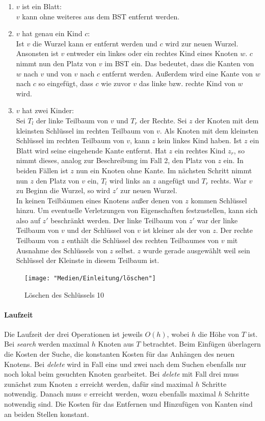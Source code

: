 \documentclass[a4paper,12pt]{article}
\begin{document}
\begin{enumerate}
	\item $v$ ist ein Blatt: \\
	$v$ kann ohne weiteres aus dem BST entfernt werden.
	\item $v$ hat genau ein Kind $c$:\\
	Ist $v$ die Wurzel kann er entfernt werden und $c$ wird zur neuen Wurzel. Ansonsten ist $v$ entweder ein linkes oder ein rechtes Kind eines Knoten $w$. $c$ nimmt nun den Platz von $v$ im BST ein. Das bedeutet, dass die Kanten von $w$ nach $v$ und von $v$ nach $c$ entfernt werden. Außerdem wird eine Kante von $w$ nach $c$ so eingefügt, dass $c$ wie zuvor $v$ das linke bzw. rechte Kind von $w$ wird. 
	\item $v$ hat zwei Kinder:\\
	Sei $T_l$ der linke Teilbaum von $v$ und $T_r$ der Rechte.
	Sei $z$ der Knoten mit dem kleinsten Schlüssel im rechten Teilbaum von $v$. Als Knoten mit dem kleinsten Schlüssel im rechten Teilbaum von $v$, kann $z$ kein linkes Kind haben. Ist $z$ ein Blatt wird seine eingehende Kante entfernt. Hat $z$ ein rechtes Kind $z_r$, so nimmt dieses, analog zur Beschreibung im Fall 2, den Platz von $z$ ein. In beiden Fällen ist $z$ nun ein Knoten ohne Kante. Im nächsten Schritt nimmt nun $z$ den Platz von $v$ ein, $T_l$ wird links an $z$ angefügt und $T_r$ rechts. War $v$ zu Beginn die Wurzel, so wird $z'$ zur neuen Wurzel.\\
	In keinen Teilbäumen eines Knotens außer denen von $z$ kommen Schlüssel hinzu. Um eventuelle Verletzungen von Eigenschaften festzustellen, kann sich also auf $z'$ beschränkt werden. Der linke Teilbaum von $z'$ war der linke Teilbaum von $v$ und der Schlüssel von $v$ ist kleiner als der von $z$. Der rechte Teilbaum von $z$ enthält die Schlüssel des rechten Teilbaumes von $v$ mit Ausnahme des Schlüssels von $z$ selbst. $z$ wurde gerade ausgewählt weil sein Schlüssel der Kleinste in diesem Teilbaum ist. 
	
	
	
	
\end{enumerate} 
\begin{figure}[H]
	\centering
	\texttt{[image: "Medien/Einleitung/löschen"]}
	\caption{Löschen des Schlüssels 10}
	\label{fig:löschen}
\end{figure}
\paragraph{Laufzeit}
Die Laufzeit der drei Operationen ist jeweils $\mathit{O(h)}$, wobei $h$ die Höhe von $T$ ist. Bei \textit{search} werden maximal $h$ Knoten aus $T$ betrachtet. Beim Einfügen überlagern die Kosten der Suche, die konstanten Kosten für das Anhängen des neuen Knotens. Bei \textit{delete} wird in Fall eins und zwei nach dem Suchen ebenfalls nur noch lokal beim gesuchten Knoten gearbeitet. Bei \textit{delete} mit Fall drei muss zunächst zum Knoten $z$ erreicht werden, dafür sind maximal $h$ Schritte notwendig. Danach muss $v$ erreicht werden, wozu ebenfalls maximal $h$ Schritte notwendig sind. Die Kosten für das Entfernen und Hinzufügen von Kanten sind an beiden Stellen konstant.  
\end{document}

